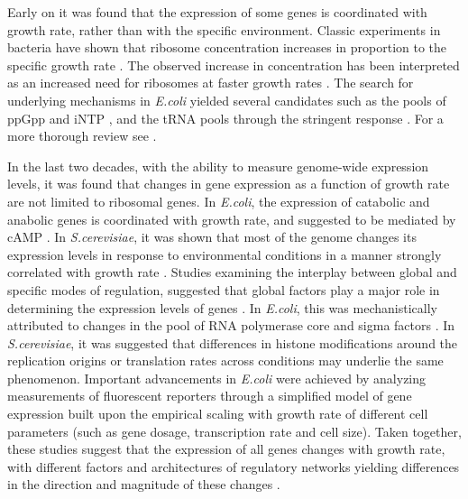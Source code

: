 \documentclass{article}
\begin{document}
Early on it was found that the expression of some genes is coordinated with growth rate, rather than with the specific environment.
Classic experiments in bacteria have shown that ribosome concentration increases in proportion to the specific growth rate \cite{Schaechter1958}.
The observed increase in concentration has been interpreted as an increased need for ribosomes at faster growth rates \cite{Neidhardt1999,Dennis2004,Zaslaver2009,Molenaar2009}.
The search for underlying mechanisms in \emph{E.coli} yielded several candidates such as the pools of ppGpp and iNTP \cite{Murray_2003,Bosdriesz_2015}, and the tRNA pools through the stringent response \cite{Chatterji2001,Brauer2008a}.
For a more thorough review see \cite{Nomura1984}.

In the last two decades, with the ability to measure genome-wide expression levels, it was found that changes in gene expression as a function of growth rate are not limited to ribosomal genes.
In \emph{E.coli}, the expression of catabolic and anabolic genes is coordinated with growth rate, and suggested to be mediated by cAMP \cite{Saldanha2004,You_2013,Peebo_2015}.
In \emph{S.cerevisiae}, it was shown that most of the genome changes its expression levels in response to environmental conditions in a manner strongly correlated with growth rate \cite{Keren2013a,Brauer2008,Castrillo2007,Gerosa2013}.
Studies examining the interplay between global and specific modes of regulation, suggested that global factors play a major role in determining the expression levels of genes \cite{Gasch2000,Klumpp2009,Klumpp2014,Scott2010,Berthoumieux2013,Keren2013a,Gerosa2013,Valgepea2013,Hui_2015}.
In \emph{E.coli}, this was mechanistically attributed to changes in the pool of RNA polymerase core and sigma factors \cite{Klumpp2008}.
In \emph{S.cerevisiae}, it was suggested that differences in histone modifications around the replication origins \cite{Regenberg2006} or translation rates \cite{Brauer2008} across conditions may underlie the same phenomenon.
Important advancements in \emph{E.coli} were achieved by analyzing measurements of fluorescent reporters through a simplified model of gene expression built upon the empirical scaling with growth rate of different cell parameters (such as gene dosage, transcription rate and cell size)\cite{Klumpp2009}.
Taken together, these studies suggest that the expression of all genes changes with growth rate, with different factors and architectures of regulatory networks yielding differences in the direction and magnitude of these changes \cite{Klumpp2009,Klumpp2014}. 
\end{document}
